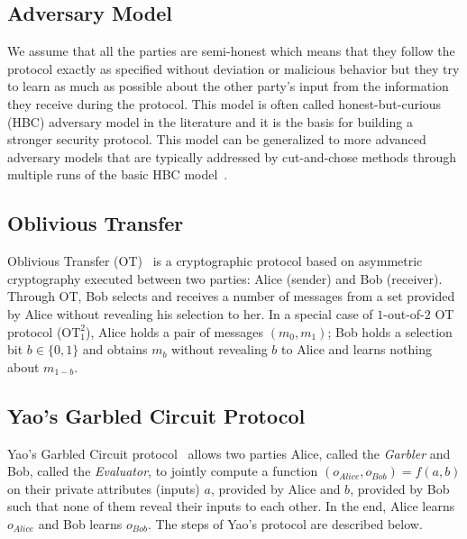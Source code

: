 \subsection{Adversary Model}\label{ssec:prelim-adv}
We assume that all the parties are semi-honest which means that they follow the protocol exactly as specified without deviation or malicious behavior but they try to learn as much as possible about the other party's input from the information they receive during the protocol.
This model is often called honest-but-curious (HBC) adversary model in the literature and it is the basis for building a stronger security protocol.
This model can be generalized to more advanced adversary models that are typically addressed by cut-and-chose methods through multiple runs of the basic HBC model~\cite{lindell2007efficient, lindell2012secure}.

\subsection{Oblivious Transfer}\label{ssec:prelim-ot}
Oblivious Transfer (OT)~\cite{naor2005computationally} is a cryptographic protocol based on asymmetric cryptography executed between two parties: Alice (sender) and Bob (receiver).
Through OT, Bob selects and receives a number of messages from a set provided by Alice without revealing his selection to her.
In a special case of $1$-out-of-$2$ OT protocol ($\textrm{OT}^2_1$), Alice holds a pair of messages $(m_{0}, m_{1})$; Bob holds a selection bit $b \in \{0, 1\}$ and obtains $m_{b}$ without revealing $b$ to Alice and learns nothing about $m_{1-b}$.

\subsection{Yao's Garbled Circuit Protocol}\label{ssec:prelim-gc}
Yao's Garbled Circuit protocol~\cite{yao1986generate} allows two parties Alice, called the \textit{Garbler} and Bob, called the \textit{Evaluator}, to jointly compute a function $(o_{Alice}, o_{Bob}) = f(a, b)$ on their private attributes (inputs) $a$, provided by Alice and $b$, provided by Bob such that none of them reveal their inputs to each other.
In the end, Alice learns $o_{Alice}$ and Bob learns $o_{Bob}$.
The steps of Yao's protocol are described below.

